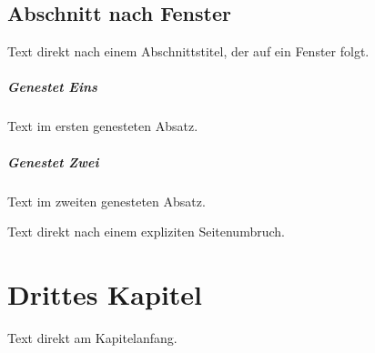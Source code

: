 \documentclass[type=report,theme=dark,language=de]{semio}
\begin{document}
\section{Abschnitt nach Fenster}

Text direkt nach einem Abschnittstitel, der auf ein Fenster folgt.

\begin{SemioNest}
\paragraph{Genestet Eins}
Text im ersten genesteten Absatz.
\paragraph{Genestet Zwei}
Text im zweiten genesteten Absatz.
\end{SemioNest}

\newpage
Text direkt nach einem expliziten Seitenumbruch.

\chapter{Drittes Kapitel}
Text direkt am Kapitelanfang.
\end{document}
